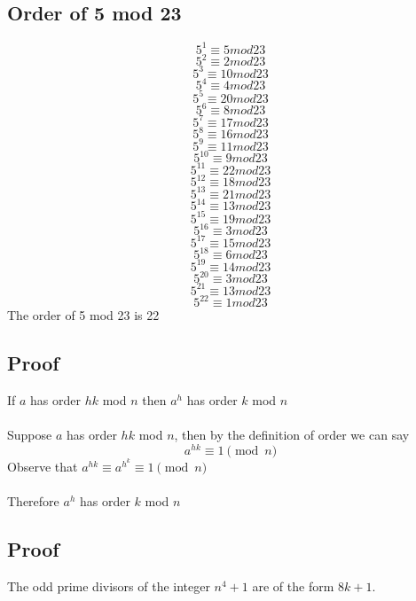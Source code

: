 \documentclass{article}
\begin{document}
\subsection{Order of 5 mod 23}
$$5^1 \equiv 5 mod 23$$
$$5^2 \equiv 2 mod 23$$
$$5^3 \equiv 10 mod 23$$
$$5^4 \equiv 4 mod 23$$
$$5^5 \equiv 20 mod 23$$
$$5^6 \equiv 8 mod 23$$
$$5^7 \equiv 17 mod 23$$
$$5^8 \equiv 16 mod 23$$
$$5^9 \equiv 11 mod 23$$
$$5^10 \equiv 9 mod 23$$
$$5^11 \equiv 22 mod 23$$
$$5^12 \equiv 18 mod 23$$
$$5^13 \equiv 21 mod 23$$
$$5^14 \equiv 13 mod 23$$
$$5^15 \equiv 19 mod 23$$
$$5^16 \equiv 3 mod 23$$
$$5^17 \equiv 15 mod 23$$
$$5^18 \equiv 6 mod 23$$
$$5^19 \equiv 14 mod 23$$
$$5^20 \equiv 3 mod 23$$
$$5^21 \equiv 13 mod 23$$
$$5^22 \equiv 1 mod 23$$
The order of 5 mod 23 is 22

\subsection{Proof}
If $a$ has order $hk$ mod $n$ then $a^{h}$ has order $k$ mod $n$
\\\\
Suppose $a$ has order $hk$ mod $n$, then by the definition of order we can say
$$a^{hk} \equiv 1 \pmod{n}$$
Observe that $a^{hk} \equiv a^{h^{k}} \equiv 1 \pmod{n}$
\\\\
Therefore $a^{h}$ has order $k$ mod $n$

\subsection{Proof}
The odd prime divisors of the integer $n^4 +1$ are of the form $8k + 1$.  

\end{document}

